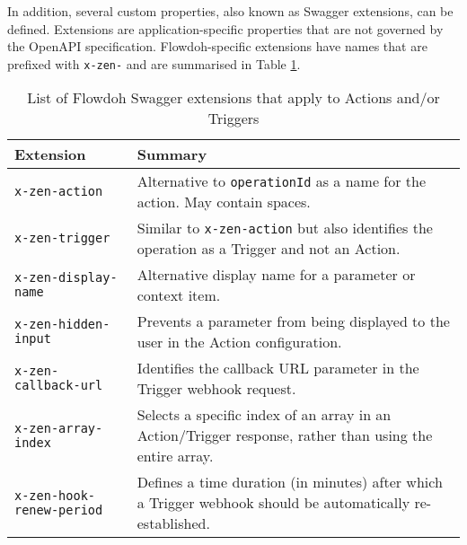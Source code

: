 In addition, several custom properties, also known as Swagger extensions, can be defined. Extensions are application-specific properties that are not governed by the OpenAPI specification. Flowdoh-specific extensions have names that are prefixed with \texttt{x-zen-} and are summarised in Table \ref{table:extensions}.
\begin{table}[h!]
\centering
    \begin{tabularx}{0.9\textwidth}{ X X }
        \hline
        Extension & Summary \\
        \hline
        \texttt{x-zen-action} & Alternative to \texttt{operationId} as a name for the action. May contain spaces. \\
        \hline
        \texttt{x-zen-trigger} & Similar to \texttt{x-zen-action} but also identifies the operation as a Trigger and not an Action. \\
        \hline
        \texttt{x-zen-display-name} & Alternative display name for a parameter or context item. \\
        \hline
        \texttt{x-zen-hidden-input} & Prevents a parameter from being displayed to the user in the Action configuration. \\
        \hline
        \texttt{x-zen-callback-url} & Identifies the callback URL parameter in the Trigger webhook request. \\
        \hline
        \texttt{x-zen-array-index} & Selects a specific index of an array in an Action/Trigger response, rather than using the entire array. \\
        \hline
        \texttt{x-zen-hook-renew-period} & Defines a time duration (in minutes) after which a Trigger webhook should be automatically re-established. \\
        \hline
    \end{tabularx}
    \caption{List of Flowdoh Swagger extensions that apply to Actions and/or Triggers}
    \label{table:extensions}
\end{table}
